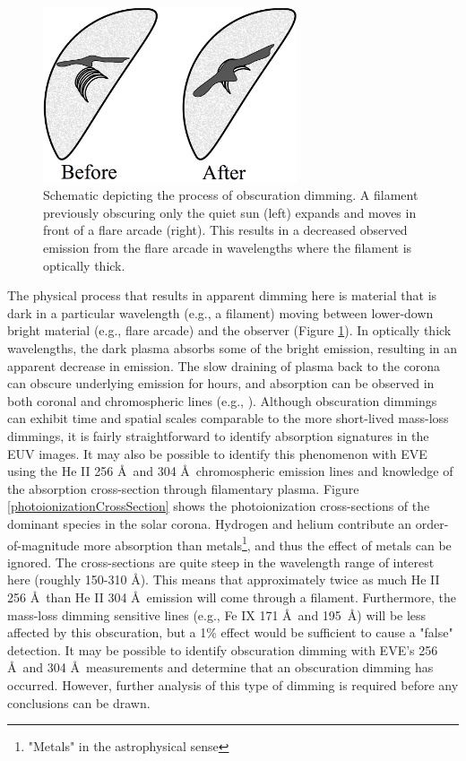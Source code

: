 \begin{figure}[!h]
    \begin{center}
        \includegraphics[width=75mm]{Images/ObscurationDimming.png}
    \end{center}
    \caption[Schematic of obscuration dimming]{
        Schematic depicting the process of obscuration dimming. A filament previously obscuring only the quiet sun (left)
        expands and moves in front of a flare arcade (right). This results in a decreased observed emission from the flare
        arcade in wavelengths where the filament is optically thick.
    }
    \label{obscurationDimming}
\end{figure}

The physical process that results in apparent dimming here is material that is dark in a particular wavelength (e.g., a filament) moving between lower-down bright material (e.g., flare arcade) and the observer (Figure \ref{obscurationDimming}). In optically thick wavelengths, the dark plasma absorbs some of the bright emission, resulting in an apparent decrease in emission. The slow draining of plasma back to the corona can obscure underlying emission for hours, and absorption can be observed in both coronal and chromospheric lines (e.g., \citealt{Gilbert2013}). Although obscuration dimmings can exhibit time and spatial scales comparable to the more short-lived mass-loss dimmings, it is fairly straightforward to identify absorption signatures in the EUV images. It may also be possible to identify this phenomenon with EVE using the He II 256 \AA\ and 304 \AA\ chromospheric emission lines and knowledge of the absorption cross-section through filamentary plasma. Figure \ref{photoionizationCrossSection} shows the photoionization cross-sections of the dominant species in the solar corona. Hydrogen and helium contribute an order-of-magnitude more absorption than metals\footnote{"Metals" in the astrophysical sense}, and thus the effect of metals can be ignored. The cross-sections are quite steep in the wavelength range of interest here (roughly 150-310 \AA). This means that approximately twice as much He II 256 \AA\ than He II 304 \AA\ emission will come through a filament. Furthermore, the mass-loss dimming sensitive lines (e.g., Fe IX 171 \AA\ and 195 \AA) will be less affected by this obscuration, but a 1\% effect would be sufficient to cause a "false" detection. It may be possible to identify obscuration dimming with EVE's 256 \AA\ and 304 \AA\ measurements and determine that an obscuration dimming has occurred. However, further analysis of this type of dimming is required before any conclusions can be drawn. 


